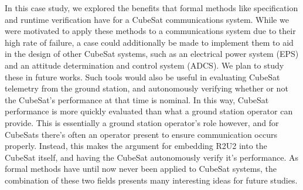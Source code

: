 \documentclass[conf]{new-aiaa}
\begin{document}
In this case study, we explored the benefits that formal methods like specification and runtime verification have for a CubeSat communications system. While we were motivated to apply these methods to a communications system due to their high rate of failure, a case could additionally be made to implement them to aid in the design of other CubeSat systems, such as an electrical power system (EPS) and an attitude determination and control system (ADCS).
 We plan to study these in future works. Such tools would also be useful in evaluating CubeSat telemetry from the ground station, and autonomously verifying whether or not the CubeSat's performance at that time is nominal. In this way, CubeSat performance is more quickly evaluated than what a ground station operator can provide. This is essentially a ground station operator's role however, and for CubeSats there's often an operator present to ensure communication occurs properly. Instead, this makes the argument for embedding R2U2 into the CubeSat itself, and having the CubeSat autonomously verify it's performance. As formal methods have until now never been applied to CubeSat systems, the combination of these two fields presents many interesting ideas for future studies.
 

\end{document}
